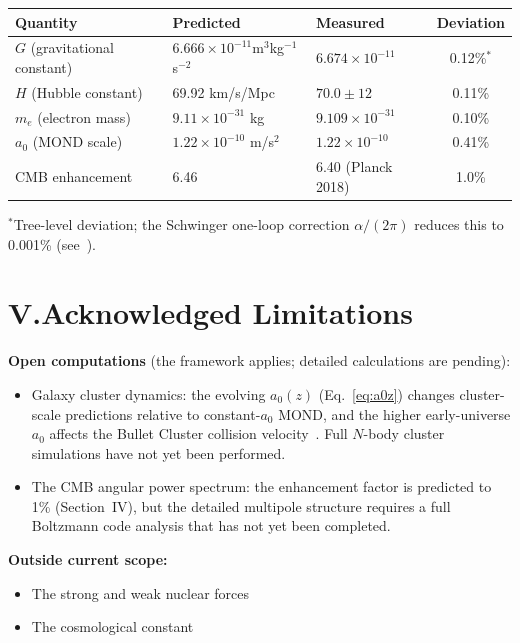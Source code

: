 \documentclass[11pt]{article}
\begin{document}
\begin{center}
\begin{tabular}{lp{4.2cm}p{3.5cm}c}
\toprule
\textbf{Quantity} & \textbf{Predicted} & \textbf{Measured} & \textbf{Deviation} \\
\midrule
$G$ (gravitational constant) & $6.666 \times 10^{-11}$\newline m$^3$kg$^{-1}$s$^{-2}$ & $6.674 \times 10^{-11}$ & 0.12\%$^*$ \\[4pt]
$H$ (Hubble constant) & 69.92 km/s/Mpc & $70.0 \pm 12$ & 0.11\% \\[4pt]
$m_e$ (electron mass) & $9.11 \times 10^{-31}$ kg & $9.109 \times 10^{-31}$ & 0.10\% \\[4pt]
$a_0$ (MOND scale) & $1.22 \times 10^{-10}$ m/s$^2$ & $1.22 \times 10^{-10}$ & 0.41\% \\[4pt]
CMB enhancement & 6.46 & 6.40 (Planck 2018) & 1.0\% \\
\bottomrule
\end{tabular}
\end{center}
\vspace{0.3em}

\noindent
${}^*$Tree-level deviation; the Schwinger one-loop correction $\alpha/(2\pi)$ reduces this to 0.001\% (see~\cite{nelson2026main}).

\section*{V.\quad Acknowledged Limitations}

\textbf{Open computations} (the framework applies; detailed calculations are pending):
\begin{itemize}[leftmargin=2em]
\item Galaxy cluster dynamics: the evolving $a_0(z)$ (Eq.~\ref{eq:a0z}) changes cluster-scale predictions relative to constant-$a_0$ MOND, and the higher early-universe $a_0$ affects the Bullet Cluster collision velocity~\cite{paper2}. Full $N$-body cluster simulations have not yet been performed.
\item The CMB angular power spectrum: the enhancement factor is predicted to 1\% (Section~IV), but the detailed multipole structure requires a full Boltzmann code analysis that has not yet been completed.
\end{itemize}

\textbf{Outside current scope:}
\begin{itemize}[leftmargin=2em]
\item The strong and weak nuclear forces
\item The cosmological constant
\end{itemize}
\end{document}
